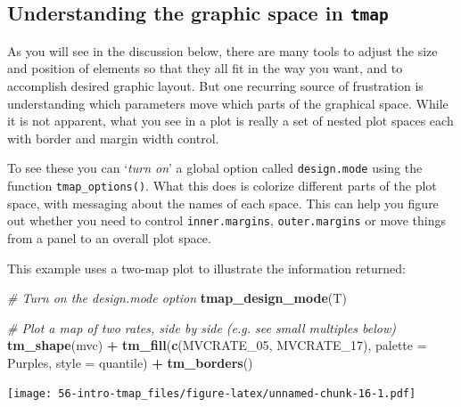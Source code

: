 \documentclass[
]{book}
\newenvironment{Shaded}{\begin{snugshade}}{\end{snugshade}}
\newcommand{\AttributeTok}[1]{\textcolor[rgb]{0.13,0.29,0.53}{#1}}
\newcommand{\CommentTok}[1]{\textcolor[rgb]{0.56,0.35,0.01}{\textit{#1}}}
\newcommand{\FunctionTok}[1]{\textcolor[rgb]{0.13,0.29,0.53}{\textbf{#1}}}
\newcommand{\NormalTok}[1]{#1}
\newcommand{\SpecialCharTok}[1]{\textcolor[rgb]{0.81,0.36,0.00}{\textbf{#1}}}
\newcommand{\StringTok}[1]{\textcolor[rgb]{0.31,0.60,0.02}{#1}}
\begin{document}
\hypertarget{understanding-the-graphic-space-in-tmap}{%
\subsection{\texorpdfstring{Understanding the graphic space in \texttt{tmap}}{Understanding the graphic space in tmap}}\label{understanding-the-graphic-space-in-tmap}}

As you will see in the discussion below, there are many tools to adjust the size and position of elements so that they all fit in the way you want, and to accomplish desired graphic layout. But one recurring source of frustration is understanding which parameters move which parts of the graphical space. While it is not apparent, what you see in a plot is really a set of nested plot spaces each with border and margin width control.

To see these you can `\emph{turn on}' a global option called \texttt{design.mode} using the function \texttt{tmap\_options()}. What this does is colorize different parts of the plot space, with messaging about the names of each space. This can help you figure out whether you need to control \texttt{inner.margins}, \texttt{outer.margins} or move things from a panel to an overall plot space.

This example uses a two-map plot to illustrate the information returned:

\begin{Shaded}
\begin{Highlighting}[]
\CommentTok{\# Turn \textquotesingle{}on\textquotesingle{} the design.mode option}
\FunctionTok{tmap\_design\_mode}\NormalTok{(T)}

\CommentTok{\# Plot a map of two rates, side by side (e.g. see small multiples below)}
\FunctionTok{tm\_shape}\NormalTok{(mvc) }\SpecialCharTok{+} 
  \FunctionTok{tm\_fill}\NormalTok{(}\FunctionTok{c}\NormalTok{(}\StringTok{\textquotesingle{}MVCRATE\_05\textquotesingle{}}\NormalTok{, }\StringTok{\textquotesingle{}MVCRATE\_17\textquotesingle{}}\NormalTok{),}
          \AttributeTok{palette =} \StringTok{\textquotesingle{}Purples\textquotesingle{}}\NormalTok{,}
          \AttributeTok{style =} \StringTok{\textquotesingle{}quantile\textquotesingle{}}\NormalTok{) }\SpecialCharTok{+}
\FunctionTok{tm\_borders}\NormalTok{()}
\end{Highlighting}
\end{Shaded}

\texttt{[image: 56-intro-tmap\_files/figure-latex/unnamed-chunk-16-1.pdf]}
\end{document}
